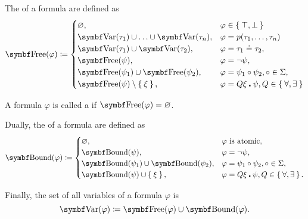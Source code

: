 \begin{definition}
\begin{DefEnum}
     The  of a formula are defined as
    \begin{equation}\label{eq:def:first_order_syntax/formula_free_variables}
      \Bold{Free}(\varphi) \coloneqq \begin{cases}
        \varnothing,                                            &\varphi \in \Set{ \top, \bot } \\
        \Bold{Var}(\tau_1) \cup \ldots \cup \Bold{Var}(\tau_n), &\varphi = p(\tau_1, \ldots, \tau_n) \\
        \Bold{Var}(\tau_1) \cup \Bold{Var}(\tau_2),             &\varphi = \tau_1 \doteq \tau_2, \\
        \Bold{Free}(\psi),                                      &\varphi = \neg \psi, \\
        \Bold{Free}(\psi_1) \cup \Bold{Free}(\psi_2),           &\varphi = \psi_1 \circ \psi_2, \circ \in \Sigma, \\
        \Bold{Free}(\psi) \setminus \Set{ \xi },                &\varphi = Q \xi \centerdot \psi, Q \in \Set{ \forall, \exists }
      \end{cases}
    \end{equation}

     A formula \( \varphi \) is called a  if \( \Bold{Free}(\varphi) = \varnothing \).

     Dually, the  of a formula are defined as
    \begin{equation}\label{eq:def:first_order_syntax/formula_bound_variables}
      \Bold{Bound}(\varphi) \coloneqq \begin{cases}
        \varnothing,                                    &\varphi \text{ is atomic}, \\
        \Bold{Bound}(\psi),                             &\varphi = \neg \psi, \\
        \Bold{Bound}(\psi_1) \cup \Bold{Bound}(\psi_2), &\varphi = \psi_1 \circ \psi_2, \circ \in \Sigma, \\
        \Bold{Bound}(\psi) \cup \Set{ \xi },            &\varphi = Q \xi \centerdot \psi, Q \in \Set{ \forall, \exists }.
      \end{cases}
    \end{equation}

     Finally, the set of all variables of a formula \( \varphi \) is
    \begin{equation}\label{eq:def:first_order_syntax/formula_variables}
      \Bold{Var}(\varphi) \coloneqq \Bold{Free}(\varphi) \cup \Bold{Bound}(\varphi).
    \end{equation}
  \end{DefEnum}
\end{definition}

